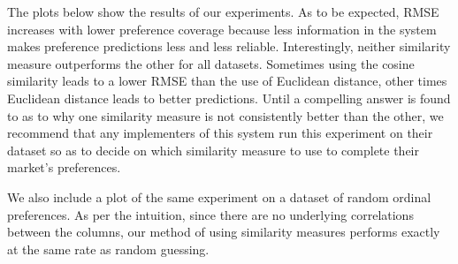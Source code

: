 The plots below show the results of our experiments. As to be expected, RMSE increases with lower preference coverage because less information in the system makes preference predictions less and less reliable. Interestingly, neither similarity measure outperforms the other for all datasets. Sometimes using the cosine similarity leads to a lower RMSE than the use of Euclidean distance, other times Euclidean distance leads to better predictions. Until a compelling answer is found to as to why one similarity measure is not consistently better than the other, we recommend that any implementers of this system run this experiment on their dataset so as to decide on which similarity measure to use to complete their market's preferences. 

We also include a plot of the same experiment on a dataset of random ordinal preferences. As per the intuition, since there are no underlying correlations between the columns, our method of using similarity measures performs exactly at the same rate as random guessing.

